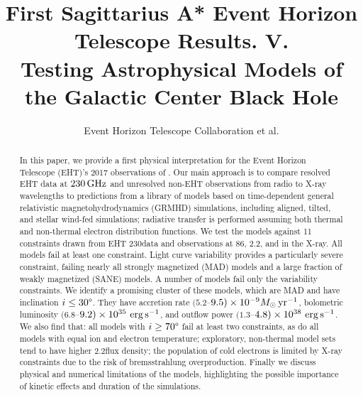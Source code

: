 \documentclass[twocolumn,twocolappendix,tighten,dvipsnames,linenumbers]{aastex63}
\begin{document}
\title{First Sagittarius A* Event Horizon Telescope Results. V.\\
  Testing Astrophysical Models of the Galactic Center Black Hole}

%
\author{Event Horizon Telescope Collaboration et al.}


\received{\today}
\revised{\today}

\begin{abstract}
  In this paper, we provide a first physical interpretation for the Event Horizon Telescope (EHT)'s 2017 observations of \sgra.
  Our main approach is to compare resolved EHT data at $230\,\mathrm{GHz}$ and unresolved non-EHT observations from radio to X-ray wavelengths to predictions from a library of models based on time-dependent general relativistic magnetohydrodynamics (GRMHD) simulations, including aligned, tilted, and stellar wind-fed simulations; radiative transfer is performed assuming both thermal and non-thermal electron distribution functions. We test the models against 11 constraints drawn from EHT 230\GHz data and observations at 86\GHz, 2.2\um, and in the X-ray.
  All models fail at least one constraint.
  Light curve variability provides a particularly severe constraint, failing nearly all strongly magnetized (MAD) models and a large fraction of weakly magnetized (SANE) models.
  A number of models fail only the variability constraints.  We identify a promising cluster of these models, which are MAD and have inclination $i \le 30\degree$.
  They  have accretion rate $(5.2$--$9.5)\times10^{-9}M_\odot\,\mathrm{yr}^{-1}$, bolometric luminosity $(6.8$--$9.2)\times10^{35}\,\,\mathrm{erg}\,\mathrm{s}^{-1}$, and outflow power $(1.3$--$4.8)\times10^{38}\,\,\mathrm{erg}\,\mathrm{s}^{-1}$.
  We also find that: all models with $i \ge 70\degree$ fail at least two constraints, as do all models with equal ion and electron temperature;  exploratory, non-thermal model sets tend to have higher 2.2\um flux density; the population of cold electrons is limited by X-ray constraints due to the risk of bremsstrahlung overproduction.
  Finally we discuss physical and numerical limitations of the models, highlighting the possible importance of kinetic effects and duration of the simulations.
\end{abstract}
\end{document}
